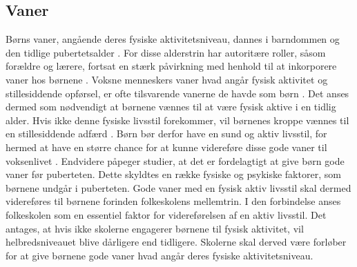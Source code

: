 \subsection{Vaner}
Børns vaner, angående deres fysiske aktivitetsniveau, dannes i barndommen og den tidlige pubertetsalder \citep{F.SallisG.Simons-MortonJ.Stone1992}. For disse alderstrin har autoritære roller, såsom forældre og lærere, fortsat en stærk påvirkning med henhold til at inkorporere vaner hos børnene \citep{L.MeyerP.Gullotta2012}. \newline
Voksne menneskers vaner hvad angår fysisk aktivitet og stillesiddende opførsel, er ofte tilsvarende vanerne de havde som børn \citep{P.J.KremersBrug2008}. Det anses dermed som nødvendigt at børnene vænnes til at være fysisk aktive i en tidlig alder. Hvis ikke denne fysiske livsstil forekommer, vil børnenes kroppe vænnes til en stillesiddende adfærd \citep{Nabe-NielsenSundhedsministerietetal.2005}. Børn bør derfor have en sund og aktiv livsstil, for hermed at have en større chance for at kunne videreføre disse gode vaner til voksenlivet \citep{L.MeyerP.Gullotta2012}. Endvidere påpeger studier, at det er fordelagtigt at give børn gode vaner før puberteten. Dette skyldtes en række fysiske og psykiske faktorer, som børnene undgår i puberteten. Gode vaner med en fysisk aktiv livsstil skal dermed videreføres til børnene forinden folkeskolens mellemtrin. I den forbindelse anses folkeskolen som en essentiel faktor for videreførelsen af en aktiv livsstil. Det antages, at hvis ikke skolerne engagerer børnene til fysisk aktivitet, vil helbredsniveauet blive dårligere end tidligere. Skolerne skal derved være forløber for at give børnene gode vaner hvad angår deres fysiske aktivitetsniveau. \citep{L.MeyerP.Gullotta2012}

